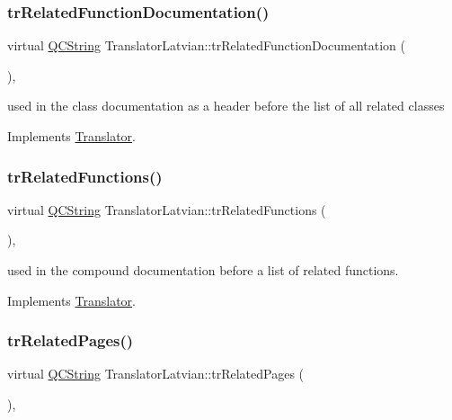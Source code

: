 \subsubsection{\texorpdfstring{trRelatedFunctionDocumentation()}{trRelatedFunctionDocumentation()}}
{\footnotesize\ttfamily virtual \mbox{\hyperlink{class_q_c_string}{Q\+C\+String}} Translator\+Latvian\+::tr\+Related\+Function\+Documentation (\begin{DoxyParamCaption}{ }\end{DoxyParamCaption})\hspace{0.3cm}{\ttfamily [inline]}, {\ttfamily [virtual]}}

used in the class documentation as a header before the list of all related classes 

Implements \mbox{\hyperlink{class_translator}{Translator}}.

\mbox{\label{class_translator_latvian_a1563b4e100c4f77f0c6becd26bff110c}} 
\subsubsection{\texorpdfstring{trRelatedFunctions()}{trRelatedFunctions()}}
{\footnotesize\ttfamily virtual \mbox{\hyperlink{class_q_c_string}{Q\+C\+String}} Translator\+Latvian\+::tr\+Related\+Functions (\begin{DoxyParamCaption}{ }\end{DoxyParamCaption})\hspace{0.3cm}{\ttfamily [inline]}, {\ttfamily [virtual]}}

used in the compound documentation before a list of related functions. 

Implements \mbox{\hyperlink{class_translator}{Translator}}.

\mbox{\label{class_translator_latvian_ac7196bb7ca7fdfd0c76b2840a6a3999c}} 
\subsubsection{\texorpdfstring{trRelatedPages()}{trRelatedPages()}}
{\footnotesize\ttfamily virtual \mbox{\hyperlink{class_q_c_string}{Q\+C\+String}} Translator\+Latvian\+::tr\+Related\+Pages (\begin{DoxyParamCaption}{ }\end{DoxyParamCaption})\hspace{0.3cm}{\ttfamily [inline]}, {\ttfamily [virtual]}}

